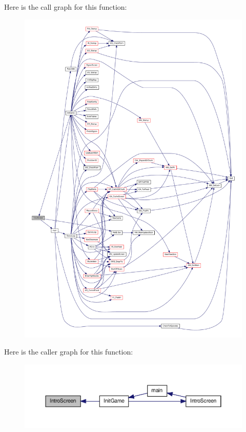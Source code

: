 Here is the call graph for this function:
\nopagebreak
\begin{figure}[H]
\begin{center}
\leavevmode
\includegraphics[width=400pt]{WL__DEF_8H_a98260bc22d24f0075ec75a375a865b1d_cgraph}
\end{center}
\end{figure}




Here is the caller graph for this function:
\nopagebreak
\begin{figure}[H]
\begin{center}
\leavevmode
\includegraphics[width=400pt]{WL__DEF_8H_a98260bc22d24f0075ec75a375a865b1d_icgraph}
\end{center}
\end{figure}


